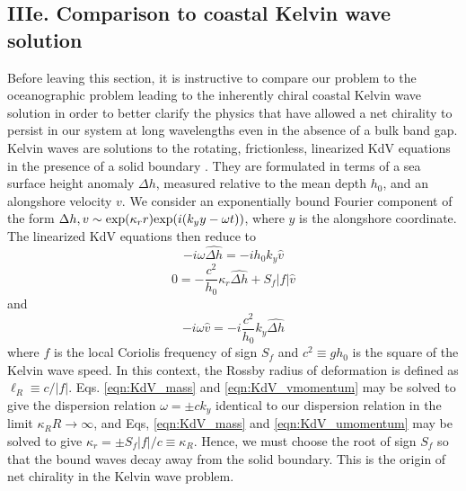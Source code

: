 \documentclass[%
 reprint,
superscriptaddress,
longbibliography,
 amsmath,amssymb,
 prl,
 citeautoscript,
]{revtex4-1}
\begin{document}
\subsection{IIIe. Comparison to coastal Kelvin wave solution}

Before leaving this section, it is instructive to compare our problem to the oceanographic problem leading to the inherently chiral coastal Kelvin wave solution in order to better clarify the physics that have allowed a net chirality to persist in our system at long wavelengths even in the absence of a bulk band gap. Kelvin waves are solutions to the rotating, frictionless, linearized KdV equations in the presence of a solid boundary \cite{Gill}. They are formulated in terms of a sea surface height anomaly $\Delta h$, measured relative to the mean depth $h_0$, and an alongshore velocity $v$. We consider an exponentially bound Fourier component of the form $\Delta h, v \sim {\rm exp} (\kappa_r r) {\rm exp} (i(k_y y - \omega t))$, where $y$ is the alongshore coordinate. The linearized KdV equations then reduce to
\begin{equation}
- i \omega \hat{\Delta h} = - i h_0 k_y \hat{v}
\label{eqn:KdV_mass}
\end{equation}
\begin{equation}
0 = - \frac{c^2}{h_0} \kappa_r \hat{\Delta h} + S_f \left| f \right| \hat{v}
\label{eqn:KdV_umomentum}
\end{equation}
and
\begin{equation}
- i \omega \hat{v} = - i \frac{c^2}{h_0} k_y \hat{\Delta h}
\label{eqn:KdV_vmomentum}
\end{equation}
where $f$ is the local Coriolis frequency of sign $S_f$ and $c^2 \equiv g h_0$ is the square of the Kelvin wave speed. In this context, the Rossby radius of deformation is defined as $\ell_R \equiv c / |f|$. Eqs. \ref{eqn:KdV_mass} and \ref{eqn:KdV_vmomentum} may be solved to give the dispersion relation $\omega = \pm c k_y$ identical to our dispersion relation in the limit $\kappa_R R \rightarrow \infty$, and Eqs, \ref{eqn:KdV_mass} and \ref{eqn:KdV_umomentum} may be solved to give $\kappa_r = \pm S_f |f|/c \equiv \kappa_R$. Hence, we must choose the root of sign $S_f$ so that the bound waves decay away from the solid boundary. This is the origin of net chirality in the Kelvin wave problem.
\end{document}
